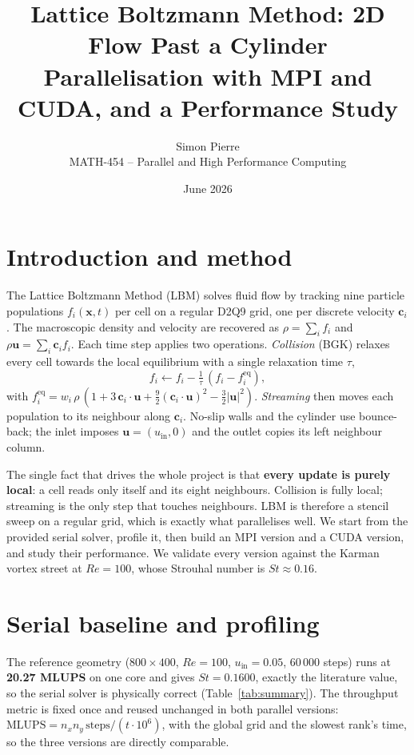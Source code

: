 \documentclass[10pt,twocolumn,a4paper]{article}
\title{\vspace{-1.2em}\textbf{Lattice Boltzmann Method: 2D Flow Past a Cylinder\\
\large Parallelisation with MPI and CUDA, and a Performance Study}}
\author{Simon Pierre \\ \small MATH-454 -- Parallel and High Performance Computing}
\date{\small June 2026}
\begin{document}
\maketitle

\section{Introduction and method}
The Lattice Boltzmann Method (LBM) solves fluid flow by tracking nine
particle populations $f_i(\mathbf{x},t)$ per cell on a regular D2Q9
grid, one per discrete velocity $\mathbf{c}_i$. The macroscopic density
and velocity are recovered as $\rho=\sum_i f_i$ and
$\rho\mathbf{u}=\sum_i \mathbf{c}_i f_i$. Each time step applies two
operations. \emph{Collision} (BGK) relaxes every cell towards the local
equilibrium with a single relaxation time $\tau$,
\begin{equation}
  f_i \leftarrow f_i - \tfrac{1}{\tau}\,(f_i - f_i^{\mathrm{eq}}),
\end{equation}
with $f_i^{\mathrm{eq}} = w_i\,\rho\,(1+3\,\mathbf{c}_i\!\cdot\!\mathbf{u}
+\tfrac{9}{2}(\mathbf{c}_i\!\cdot\!\mathbf{u})^2-\tfrac{3}{2}|\mathbf{u}|^2)$.
\emph{Streaming} then moves each population to its neighbour along
$\mathbf{c}_i$. No-slip walls and the cylinder use bounce-back; the inlet
imposes $\mathbf{u}=(u_{\mathrm{in}},0)$ and the outlet copies its left
neighbour column.

The single fact that drives the whole project is that \textbf{every
update is purely local}: a cell reads only itself and its eight
neighbours. Collision is fully local; streaming is the only step that
touches neighbours. LBM is therefore a stencil sweep on a regular grid,
which is exactly what parallelises well. We start from the provided
serial solver, profile it, then build an MPI version and a CUDA version,
and study their performance. We validate every version against the Karman
vortex street
at $Re=100$, whose Strouhal number is $St\approx0.16$.

\section{Serial baseline and profiling}
The reference geometry ($800\times400$, $Re=100$, $u_{\mathrm{in}}=0.05$,
60\,000 steps) runs at \textbf{20.27 MLUPS} on one core and gives
$St=0.1600$, exactly the literature value, so the serial solver is
physically correct (Table~\ref{tab:summary}). The throughput metric is
fixed once and reused unchanged in both parallel versions:
$\mathrm{MLUPS}=n_x n_y\,\text{steps}/(t\cdot10^6)$, with the global grid
and the slowest rank's time, so the three versions are directly
comparable.
\end{document}
